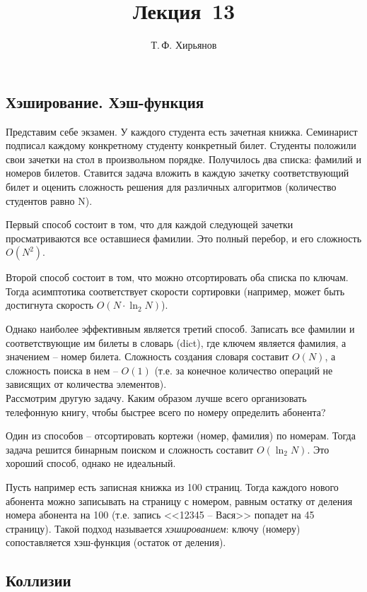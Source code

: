 \documentclass[a4paper, fleqn]{article}
\title{Лекция \textnumero\,13}
\author{Т.\,Ф. Хирьянов}
\date{}
\begin{document}
	\maketitle

\subsection*{Хэширование. Хэш-функция}

Представим себе экзамен. У каждого студента есть зачетная книжка. Семинарист подписал каждому конкретному студенту конкретный билет. Студенты положили свои зачетки на стол в произвольном порядке. Получилось два списка: фамилий и номеров билетов. Ставится задача вложить в каждую зачетку соответствующий билет и оценить сложность решения для различных алгоритмов (количество студентов равно N). 

Первый способ состоит в том, что для каждой следующей зачетки просматриваются все оставшиеся фамилии. Это полный перебор, и его сложность $O(N^2)$. 

Второй способ состоит в том, что можно отсортировать оба списка по ключам. Тогда асимптотика соответствует скорости сортировки (например, может быть достигнута скорость $O(N\cdot\ln_2{N})$).

Однако наиболее эффективным является третий способ. Записать все фамилии и соответствующие им билеты в словарь (dict), где ключем является фамилия, а значением -- номер билета. Сложность создания словаря составит $O(N)$, а сложность поиска в нем -- $O(1)$ (т.е. за конечное количество операций не зависящих от количества элементов).\\ 

Рассмотрим другую задачу. Каким образом лучше всего организовать телефонную книгу, чтобы быстрее всего по номеру определить абонента?
 
Один из способов -- отсортировать кортежи (номер, фамилия) по номерам. Тогда задача решится бинарным поиском и сложность составит $O(\ln_2{N})$. Это хороший способ, однако не идеальный.

Пусть например есть записная книжка из 100 страниц. Тогда каждого нового абонента можно записывать на страницу с номером, равным остатку от деления номера абонента на 100 (т.е. запись <<12345 -- Вася>> попадет на 45 страницу).
Такой подход называется \emph{хэшированием}: ключу (номеру) сопоставляется хэш-функция (остаток от деления). 
\subsection*{Коллизии}
\end{document}
